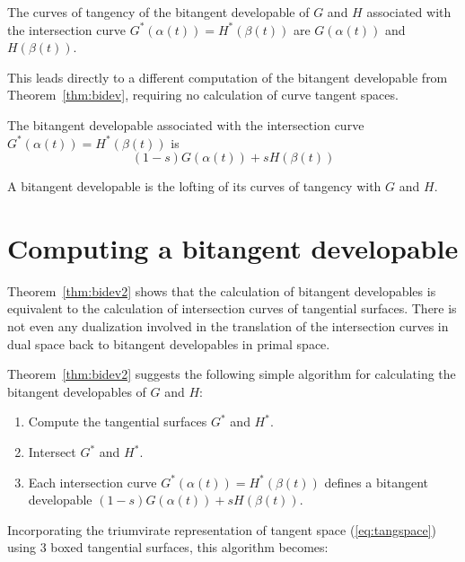\documentclass[12pt]{article}
\newif\ifJournal
\begin{document}
\begin{corollary}
\label{cor:curveoftang2}
The curves of tangency of the bitangent developable of $G$ and $H$
associated with the intersection curve $G^*(\alpha(t)) = H^*(\beta(t))$
are $G(\alpha(t))$ and $H(\beta(t))$.
\end{corollary}

This leads directly to a different computation of the bitangent developable
from Theorem~\ref{thm:bidev}, requiring no calculation
of curve tangent spaces.

\begin{theorem}
\label{thm:bidev2}
The bitangent developable associated with the intersection curve
$G^*(\alpha(t)) = H^*(\beta(t))$ is 
\[
	(1-s) G(\alpha(t)) + s H(\beta(t))
\]
\end{theorem}
\prf
A bitangent developable is the lofting of its curves of tangency
with $G$ and $H$.
\QED

\clearpage


\section{Computing a bitangent developable}
\label{sec:bitangcompute}

Theorem~\ref{thm:bidev2} shows that the calculation of bitangent 
developables is equivalent to 
the calculation of intersection curves of tangential surfaces.
There is not even any dualization involved in the translation of 
the intersection curves in dual space back to bitangent developables in
primal space.
\ifJournal
This is a benefit of the equivalence between parameter values of a tangent plane
in dual space and a point in primal space.
\fi

Theorem~\ref{thm:bidev2} suggests the following simple algorithm
for calculating the bitangent developables of $G$ and $H$:
\begin{enumerate}
\item Compute the tangential surfaces $G^*$ and $H^*$.
\item Intersect $G^*$ and $H^*$.
\item Each intersection curve $G^*(\alpha(t)) = H^*(\beta(t))$ 
      defines a bitangent developable $(1-s) G(\alpha(t)) + s H(\beta(t))$.
\end{enumerate}

Incorporating the triumvirate representation of tangent space (\ref{eq:tangspace})
using 3 boxed tangential surfaces, this algorithm becomes:
\end{document}
